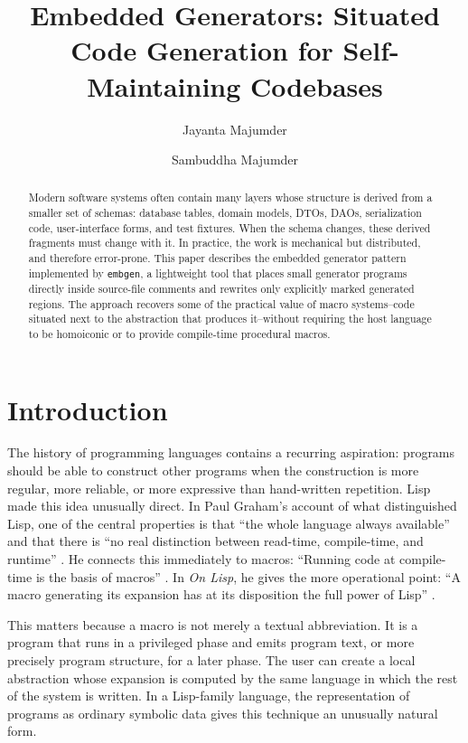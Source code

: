 \documentclass[11pt]{article}
\title{Embedded Generators: Situated Code Generation for Self-Maintaining Codebases}
\author{Jayanta Majumder \and Sambuddha Majumder}
\date{}
\begin{document}
\maketitle

\begin{abstract}
Modern software systems often contain many layers whose structure is derived
from a smaller set of schemas: database tables, domain models, DTOs, DAOs,
serialization code, user-interface forms, and test fixtures.  When the schema
changes, these derived fragments must change with it.  In practice, the work is
mechanical but distributed, and therefore error-prone.  This paper describes
the embedded generator pattern implemented by \texttt{embgen}, a lightweight
tool that places small generator programs directly inside source-file comments
and rewrites only explicitly marked generated regions.  The approach recovers
some of the practical value of macro systems--code situated next to the
abstraction that produces it--without requiring the host language to be
homoiconic or to provide compile-time procedural macros.
\end{abstract}

\section{Introduction}

The history of programming languages contains a recurring aspiration: programs
should be able to construct other programs when the construction is more
regular, more reliable, or more expressive than hand-written repetition.  Lisp
made this idea unusually direct.  In Paul Graham's account of what distinguished
Lisp, one of the central properties is that ``the whole language always
available'' and that there is ``no real distinction between read-time,
compile-time, and runtime'' \cite{graham-diff}.  He connects this immediately
to macros: ``Running code at compile-time is the basis of macros''
\cite{graham-diff}.  In \emph{On Lisp}, he gives the more operational point:
``A macro generating its expansion has at its disposition the full power of
Lisp'' \cite{graham-onlisp}.

This matters because a macro is not merely a textual abbreviation.  It is a
program that runs in a privileged phase and emits program text, or more
precisely program structure, for a later phase.  The user can create a local
abstraction whose expansion is computed by the same language in which the rest
of the system is written.  In a Lisp-family language, the representation of
programs as ordinary symbolic data gives this technique an unusually natural
form.
\end{document}
